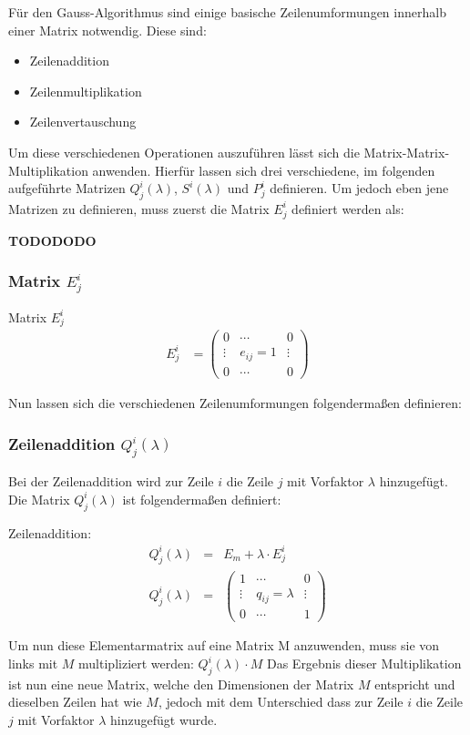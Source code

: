 
Für den Gauss-Algorithmus sind einige basische Zeilenumformungen innerhalb einer Matrix notwendig. Diese sind:

\begin{itemize}
\item Zeilenaddition
\item Zeilenmultiplikation
\item Zeilenvertauschung
\end{itemize}

Um diese verschiedenen Operationen auszuführen lässt sich die Matrix-Matrix-Multiplikation anwenden. Hierfür lassen sich drei verschiedene, im folgenden aufgeführte Matrizen $Q^i_j(\lambda)$, $S^i(\lambda)$ und $P^i_j$ definieren.
Um jedoch eben jene Matrizen zu definieren, muss zuerst die Matrix $E^i_j$ definiert werden als:


\textbf{TODODODO}
\subsubsection{Matrix $E^i_j$}
\begin{Def} Matrix $E^i_j$
\begin{align*}
 	E^i_j &=
	 	\begin{pmatrix}
	 	0 & \cdots & 0 \\
	 	\vdots & e_{ij} = 1 & \vdots \\
	 	0 & \cdots & 0 
 	\end{pmatrix}
\end{align*}
\end{Def}

\vspace{8pt}

\raggedright Nun lassen sich die verschiedenen Zeilenumformungen folgendermaßen definieren:
\subsubsection{Zeilenaddition $Q^i_j(\lambda)$}
Bei der Zeilenaddition wird zur Zeile $i$ die Zeile $j$ mit Vorfaktor $\lambda$ hinzugefügt.
Die Matrix $Q^i_j(\lambda)$ ist folgendermaßen definiert:
\begin{Def} Zeilenaddition:
\begin{align*}
	Q^i_j(\lambda) & = & E_m + \lambda \cdot E^i_j \\
	Q^i_j(\lambda) & = & 
	\begin{pmatrix}
	1 & \cdots & 0 \\ 
	\vdots &  q_{ij} = \lambda & \vdots \\  
	0 & \cdots & 1
	\end{pmatrix} 
\end{align*}
\end{Def}
\raggedright
Um nun diese Elementarmatrix auf eine Matrix M anzuwenden, muss sie von links mit $M$ multipliziert werden: $Q^i_j(\lambda) \cdot M$
Das Ergebnis dieser Multiplikation ist nun eine neue Matrix, welche den Dimensionen der Matrix $M$ entspricht und dieselben Zeilen hat wie $M$, jedoch mit dem Unterschied dass zur Zeile $i$ die Zeile $j$ mit Vorfaktor $\lambda$ hinzugefügt wurde.

